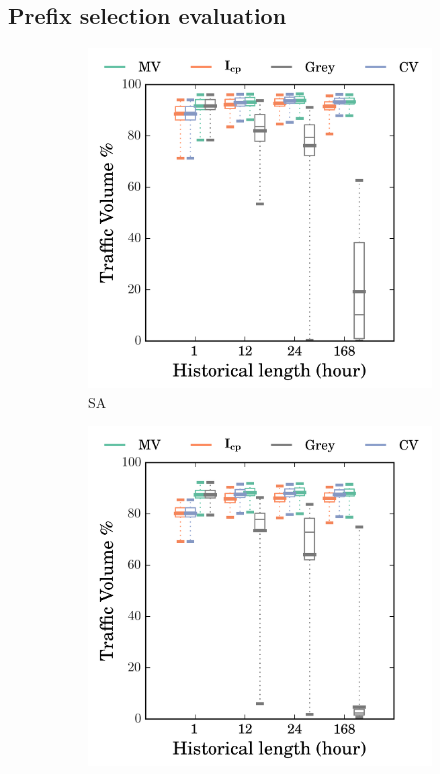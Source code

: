\subsection{Prefix selection evaluation}
\begin{figure}
		\centering
        \begin{subfigure}[b]{0.48\textwidth}
                \includegraphics[width=\textwidth]{gfx/chap2/grey_cvg_box_method_compare_fs_sa.png}
                \caption{SA}
                \label{fig:cvg_sa}
        \end{subfigure}
        \begin{subfigure}[b]{0.48\textwidth}
                \includegraphics[width=\textwidth]{gfx/chap2/grey_cvg_box_method_compare_fs_sb.png}

\end{subfigure}
\end{figure}
